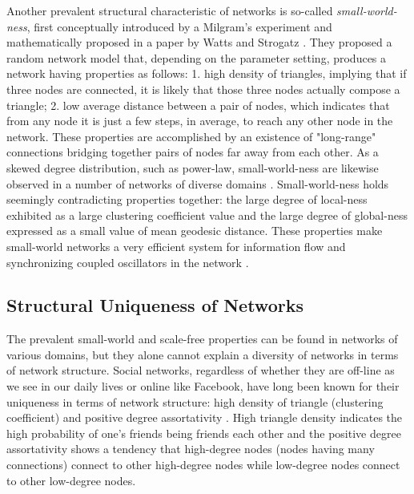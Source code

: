 \documentclass{article}
\begin{document}
	Another prevalent structural characteristic of networks is so-called \textit{small-world-ness}, first conceptually introduced by a Milgram's experiment \cite{Milgram} and mathematically proposed in a paper by Watts and Strogatz \cite{watts1998cds}. They proposed a random network model that, depending on the parameter setting, produces a network having properties as follows: 1. high density of triangles, implying that if three nodes are connected, it is likely that those three nodes actually compose a triangle; 2. low average distance between a pair of nodes, which indicates that from any node it is just a few steps, in average, to reach any other node in the network. These properties are accomplished by an existence of "long-range" connections bridging together pairs of nodes far away from each other. As a skewed degree distribution, such as power-law, small-world-ness are likewise observed in a number of networks of diverse domains \cite{Network_Small-World-Ness}. Small-world-ness holds seemingly contradicting properties together: the large degree of local-ness exhibited as a large clustering coefficient value and the large degree of global-ness expressed as a small value of mean geodesic distance.  These properties make small-world networks a very efficient system for information flow \cite{SmallWorldEfficiency} and synchronizing coupled oscillators in the network \cite{SmallWorldSynchronization}.
	
	
	
	\subsection{Structural Uniqueness of Networks}
The prevalent small-world and scale-free properties can be found in networks of various domains, but they alone cannot explain a diversity of networks in terms of network structure. Social networks, regardless of whether they are off-line as we see in our daily lives or online like Facebook, have long been known for their uniqueness in terms of network structure: high density of triangle (clustering coefficient) and positive degree assortativity \cite{AssortativeMixing,WhySocialNetworks, Mislove:2007:OnlineSocial}. High triangle density indicates the high probability of one's friends being friends each other and the positive  degree assortativity shows a tendency that high-degree nodes (nodes having many connections) connect to other high-degree nodes while low-degree nodes connect to other low-degree nodes.
\end{document}
